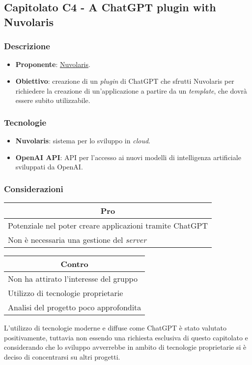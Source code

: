 \subsection{Capitolato C4 - A ChatGPT plugin with Nuvolaris}


\subsubsection{Descrizione}
\begin{itemize}
    \item \textbf{Proponente}: \href{https://www.nuvolaris.io/}{Nuvolaris}.
    \item \textbf{Obiettivo}: creazione di un \textit{plugin} di ChatGPT che sfrutti Nuvolaris per richiedere la creazione di un'applicazione a partire da un \textit{template}, che dovrà essere subito utilizzabile.
\end{itemize}


\subsubsection{Tecnologie}
\begin{itemize}
    \item \textbf{Nuvolaris}: sistema per lo sviluppo in \textit{cloud}.
    \item \textbf{OpenAI API}: API per l'accesso ai nuovi modelli di intelligenza artificiale sviluppati da OpenAI.
\end{itemize}


\subsubsection{Considerazioni}
\begin{minipage}[t]{0.45\linewidth}
    \vspace{0pt}
    {\renewcommand{\arraystretch}{1.5}
    \begin{tabular}{p{1\linewidth}}
        \multicolumn{1}{c}{\textbf{Pro}} \\
        \midrule
        Potenziale nel poter creare applicazioni tramite ChatGPT\\
        Non è necessaria una gestione del \textit{server}\\
        \hline
    \end{tabular}
    }
\end{minipage}
\hspace{0.05\linewidth}
\begin{minipage}[t]{0.45\linewidth}
    \vspace{0pt}
    {\renewcommand{\arraystretch}{1.5}
    \begin{tabular}{p{1\linewidth}}
        \multicolumn{1}{c}{\textbf{Contro}} \\
        \midrule
        Non ha attirato l'interesse del gruppo \\
        Utilizzo di tecnologie proprietarie \\
        Analisi del progetto poco approfondita \\
        \hline
    \end{tabular}
    }
\end{minipage}
\vspace{1em}

\noindent
L'utilizzo di tecnologie moderne e diffuse come ChatGPT è stato valutato positivamente, tuttavia non essendo una richiesta esclusiva di questo capitolato e considerando che lo sviluppo avverrebbe in ambito di tecnologie proprietarie si è deciso di concentrarsi su altri progetti.